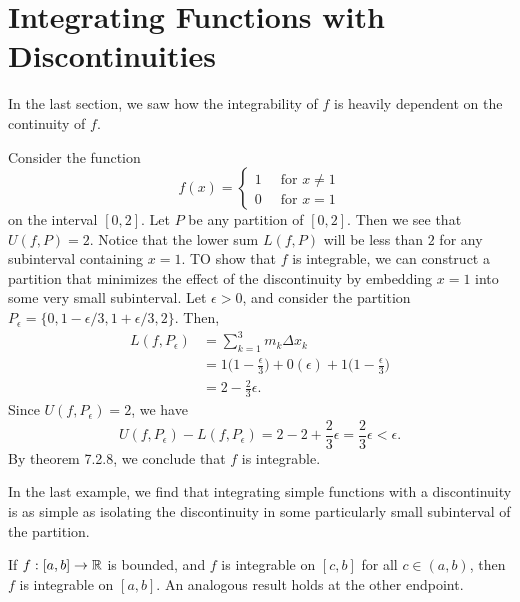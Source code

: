 \section{Integrating Functions with Discontinuities}

In the last section, we saw how the integrability of \( f  \) is heavily dependent on the continuity of \( f  \). 
\begin{example}{}{}
Consider the function
\[  f(x) = 
\begin{cases}
	1 \ &\text{ for } x \neq 1 \\
	0 \ &\text{ for } x = 1
\end{cases} \] on the interval \( [0,2]  \). Let \( P  \) be any partition of \( [0,2] \). Then we see that \( U(f,P) = 2  \). Notice that the lower sum \( L(f,P ) \) will be less than \( 2  \) for any subinterval containing \( x = 1  \). TO show that \( f  \) is integrable, we can construct a partition that minimizes the effect of the discontinuity by embedding \( x = 1  \) into some very small subinterval.
Let \( \epsilon > 0  \), and consider the partition \( P_{\epsilon } = \{ 0, 1 - \epsilon / 3, 1 + \epsilon / 3, 2  \}. \) Then, 
\begin{align*}
    L(f, P_{\epsilon }) &= \sum_{ k=1 }^{ 3 } m_{k} \Delta x_{k} \\
						&= 1 \Big( 1 - \frac{ \epsilon  }{ 3 }  \Big) + 0(\epsilon ) + 1 \Big( 1 - \frac{ \epsilon  }{ 3 }  \Big) \\
						&= 2 - \frac{ 2 }{ 3 } \epsilon.
\end{align*}
Since \( U(f, P_{\epsilon }) = 2  \), we have 
\[  U(f, P_{\epsilon }) - L(f, P_{\epsilon }) = 2 - 2 +  \frac{ 2  }{ 3  } \epsilon = \frac{  2 }{ 3  } \epsilon < \epsilon. \] By theorem 7.2.8, we conclude that \( f  \) is integrable.
\end{example}

In the last example, we find that integrating simple functions with a discontinuity is as simple as isolating the discontinuity in some particularly small subinterval of the partition. 

\begin{theorem}{}{}
	If \( f: [a,b] \to \mathbb{R}  \) is bounded, and \( f  \) is integrable on \( [c,b] \) for all \( c \in (a,b)  \), then \( f  \) is integrable on \( [a,b]  \). An analogous result holds at the other endpoint. 
\end{theorem}

